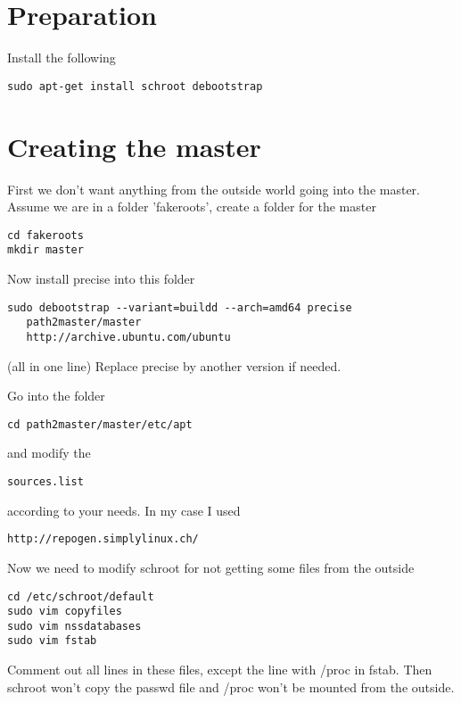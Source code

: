 \documentclass[a4paper]{article}
\begin{document}
\section{Preparation}

Install the following

\begin{verbatim}
sudo apt-get install schroot debootstrap
\end{verbatim}

\section{Creating the master}

First we don't want anything from the outside world going into the master.
Assume we are in a folder 'fakeroots', create a folder for the master

\begin{verbatim}
cd fakeroots
mkdir master
\end{verbatim}

Now install precise into this folder

\begin{verbatim}
sudo debootstrap --variant=buildd --arch=amd64 precise 
   path2master/master 
   http://archive.ubuntu.com/ubuntu
\end{verbatim}

(all in one line)
Replace precise by another version if needed.

Go into the folder

\begin{verbatim}
cd path2master/master/etc/apt
\end{verbatim}

and modify the \begin{verbatim}sources.list\end{verbatim} according to your needs. In my case I used

\begin{verbatim}
http://repogen.simplylinux.ch/
\end{verbatim}

Now we need to modify schroot for not getting some files from the outside

\begin{verbatim}
cd /etc/schroot/default
sudo vim copyfiles
sudo vim nssdatabases
sudo vim fstab
\end{verbatim}

Comment out all lines in these files, except the line with /proc in fstab. Then schroot won't copy the passwd file and /proc won't be mounted from the outside.
\end{document}
